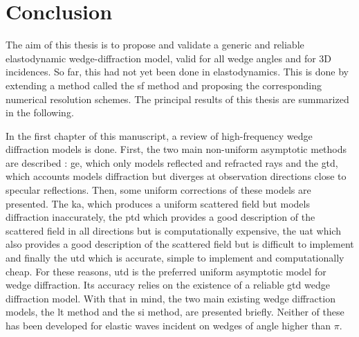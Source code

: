 \chapter*{Conclusion}

The aim of this thesis is to propose and validate a generic and reliable elastodynamic wedge-diffraction model, valid for all wedge angles and for 3D incidences. So far, this had not yet been done in elastodynamics. This is done by extending a method called the \acrfull{sf} method and proposing the corresponding numerical resolution schemes. The principal results of this thesis are summarized in the following.

In the first chapter of this manuscript, a review of high-frequency wedge diffraction models is done. First, the two main non-uniform asymptotic methods are described : \acrfull{ge}, which only models reflected and refracted rays and the \acrfull{gtd}, which accounts models diffraction but diverges at observation directions close to specular reflections. Then, some uniform corrections of these models are presented. The \acrfull{ka}, which produces a uniform scattered field but models diffraction inaccurately, the \acrfull{ptd} which provides a good description of the scattered field in all directions but is computationally expensive, the \acrfull{uat} which also provides a good description of the scattered field but is difficult to implement and finally the \acrfull{utd} which is accurate, simple to implement and computationally cheap. For these reasons, \acrshort{utd} is the preferred uniform asymptotic model for wedge diffraction. Its accuracy relies on the existence of a reliable \acrshort{gtd} wedge diffraction model. With that in mind, the two main existing wedge diffraction models, the \acrfull{lt} method and the \acrfull{si} method, are presented briefly. Neither of these has been developed for elastic waves incident on wedges of angle higher than $\pi$.

